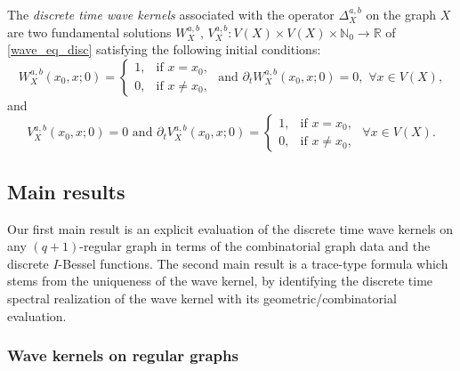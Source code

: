 \documentclass[reqno,10pt]{amsart}
\theoremstyle{definition}
\numberwithin{equation}{section}
\begin{document}
The \textit{discrete time wave kernels} associated with the operator $\Delta_X^{a,b}$ on the graph $X$ are two fundamental solutions $W_X^{a,b},\,V_X^{a,b}: V(X)\times V(X)\times\mathbb N_0 \to \mathbb R$ of \eqref{wave_eq_disc} satisfying the following  initial conditions:
\begin{equation}\label{cond1}
W_{X}^{a,b}(x_0, x; 0) =
\begin{cases}
1, & \text{if } x = x_0, \\
0, & \text{if } x \neq x_0,
\end{cases} \text{   and   } \partial_t W_{X}^{a,b}(x_0, x; 0) = 0,\,\, \forall x\in V(X),
\end{equation}
and
\begin{equation}\label{cond on V}
V_{X}^{a,b}(x_0, x; 0) = 0  \text{   and   } \partial_t  V_{X}^{a,b}(x_0, x; 0) =
\begin{cases}
1, & \text{if } x = x_0, \\
0, & \text{if } x \neq x_0,
\end{cases} \,\, \forall x\in V(X).
\end{equation}

\subsection{Main results}

Our first main result is an explicit evaluation of the discrete time wave kernels on any $(q+1)$-regular graph in terms of the combinatorial graph data and the discrete $I$-Bessel functions. The second main result is a trace-type formula which stems from the uniqueness of the wave kernel, by identifying the discrete time spectral realization of the wave kernel with its geometric/combinatorial evaluation.

\subsubsection{Wave kernels on regular graphs}
\end{document}
